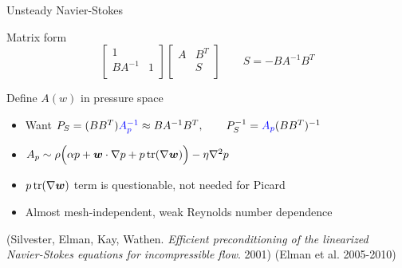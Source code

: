 \begin{frame}{Unsteady Navier-Stokes}
\begin{block}{Matrix form}
\[    \begin{bmatrix} 1 & \\ BA^{-1} & 1 \\ \end{bmatrix}
    \begin{bmatrix} A & B^T \\ & S \\ \end{bmatrix}\qquad S = -BA^{-1}B^T
    \]
  \end{block}
  \vspace{-0.5em}
  \begin{block}{Define $A(w)$ in pressure space}
    \begin{itemize}
    \item Want $P_S = (BB^T) {\color{blue} A_p^{-1}} \approx B A^{-1} B^T,\qquad P_S^{-1} = {\color{blue} A_p} (BB^T)^{-1}$
    \item {\color{blue} $A_p \sim \rho \Big(\alpha p + \bm w\cdot \nabla p + p \operatorname{tr} (\nabla\bm w)\Big) - \eta \nabla^2 p$}
    \item $p\operatorname{tr}(\nabla\bm w)$ term is questionable, not needed for Picard
    \item Almost mesh-independent, weak Reynolds number dependence
    \end{itemize}
  \end{block}
  \vspace{-0.8em}
  {\scriptsize (Silvester, Elman, Kay, Wathen. \emph{Efficient preconditioning of the linearized Navier-Stokes equations for incompressible flow}. 2001) \quad (Elman et al. 2005-2010)}
\end{frame}
